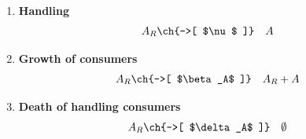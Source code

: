 \begin{enumerate}
\begin{eqnarray}
	A + R  & \ch{->[ $\alpha$ ]} & A_R + \emptyset \label{Attack}
	\end{eqnarray}
	\item \bfseries{Handling}
	\begin{eqnarray}
	A_R  & \ch{->[ $\nu$ ]} & A \label{Handling}
	\end{eqnarray}
	\item \bfseries{Growth of consumers}
	\begin{eqnarray}
	A_R  & \ch{->[ $\beta_A$ ]} & A_R + A \label{Growth_A}
	\end{eqnarray}
	\item \bfseries{Death of handling consumers}
	\begin{eqnarray}
	A_R  & \ch{->[ $\delta_A$ ]} & \emptyset \label{Death_AR}
	\end{eqnarray}
\end{enumerate}


